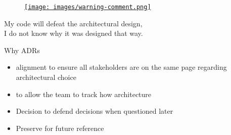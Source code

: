 \documentclass{slide}
\begin{document}
\begin{frame}

\begin{figure}
    \href{https://decodenatura.com/bad-comments-and-how-to-fix-them/}{\texttt{[image: images/warning-comment.png]}}
\end{figure}

\end{frame}


{My code will defeat the architectural design,\\
 I do not know why it was designed that way.}


\begin{frame}{Why ADRs}

\Large{
\begin{itemize}
    \item {} alignment to ensure all stakeholders are on the same page regarding architectural choice
    \item {} to allow the team to track how architecture 
    \item Decision  to defend decisions when questioned later
    \item Preserve  for future reference
\end{itemize}
}

\end{frame}



\end{document}

